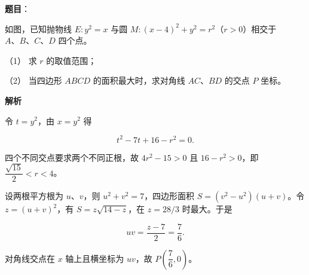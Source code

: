 \begin{answer}

\textbf{题目}：

如图，已知抛物线 $E:y^2=x$ 与圆 $M:(x-4)^2+y^2=r^2$（$r>0$）相交于 $A\text{、}B\text{、}C\text{、}D$ 四个点。
\nopagebreak[4]
\begin{center}\end{center}
\nopagebreak[4]
（1） 求 $r$ 的取值范围；

（2） 当四边形 $ABCD$ 的面积最大时，求对角线 $AC\text{、}BD$ 的交点 $P$ 坐标。

\textbf{解析}


令 $t=y^2$，由 $x=y^2$ 得

\nopagebreak[4]
\[
t^2-7t+16-r^2=0.
\]

四个不同交点要求两个不同正根，故
$4r^2-15>0$ 且 $16-r^2>0$，即
$\dfrac{\sqrt{15}}2<r<4$。


设两根平方根为 $u\text{、}v$，则 $u^2+v^2=7$，四边形面积
$S=(v^2-u^2)(u+v)$。令 $z=(u+v)^2$，有
$S=z\sqrt{14-z}$，在 $z=28/3$ 时最大。于是

\nopagebreak[4]
\[
uv=\frac{z-7}{2}=\frac76.
\]

对角线交点在 $x$ 轴上且横坐标为 $uv$，故
$P\left(\dfrac76,0\right)$。



\end{answer}
